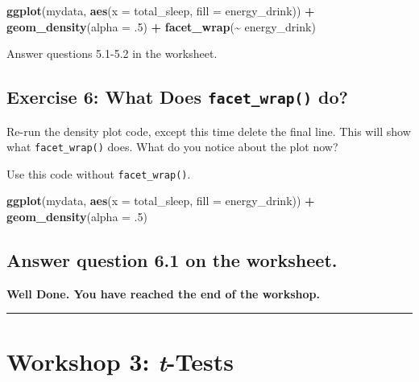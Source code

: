 \documentclass[
]{book}
\newenvironment{Shaded}{\begin{snugshade}}{\end{snugshade}}
\newcommand{\AttributeTok}[1]{\textcolor[rgb]{0.13,0.29,0.53}{#1}}
\newcommand{\DecValTok}[1]{\textcolor[rgb]{0.00,0.00,0.81}{#1}}
\newcommand{\FunctionTok}[1]{\textcolor[rgb]{0.13,0.29,0.53}{\textbf{#1}}}
\newcommand{\NormalTok}[1]{#1}
\newcommand{\SpecialCharTok}[1]{\textcolor[rgb]{0.81,0.36,0.00}{\textbf{#1}}}
\let\oldsection\section
\renewcommand{\section}{\needspace{5\baselineskip}\oldsection}
\begin{document}
\begin{Shaded}
\begin{Highlighting}[]
\FunctionTok{ggplot}\NormalTok{(mydata, }\FunctionTok{aes}\NormalTok{(}\AttributeTok{x =}\NormalTok{ total\_sleep, }\AttributeTok{fill =}\NormalTok{ energy\_drink)) }\SpecialCharTok{+}
  \FunctionTok{geom\_density}\NormalTok{(}\AttributeTok{alpha =}\NormalTok{ .}\DecValTok{5}\NormalTok{) }\SpecialCharTok{+}
  \FunctionTok{facet\_wrap}\NormalTok{(}\SpecialCharTok{\textasciitilde{}}\NormalTok{ energy\_drink)}
\end{Highlighting}
\end{Shaded}

Answer questions 5.1-5.2 in the worksheet.

\section{\texorpdfstring{Exercise 6: What Does \texttt{facet\_wrap()} do?}{Exercise 6: What Does facet\_wrap() do?}}\label{exercise-6-what-does-facet_wrap-do}

Re-run the density plot code, except this time delete the final line. This will show what \texttt{facet\_wrap()} does. What do you notice about the plot now?

Use this code without \texttt{facet\_wrap()}.

\begin{Shaded}
\begin{Highlighting}[]
\FunctionTok{ggplot}\NormalTok{(mydata, }\FunctionTok{aes}\NormalTok{(}\AttributeTok{x =}\NormalTok{ total\_sleep, }\AttributeTok{fill =}\NormalTok{ energy\_drink)) }\SpecialCharTok{+}
  \FunctionTok{geom\_density}\NormalTok{(}\AttributeTok{alpha =}\NormalTok{ .}\DecValTok{5}\NormalTok{)}
\end{Highlighting}
\end{Shaded}

\section{Answer question 6.1 on the worksheet.}\label{answer-question-6.1-on-the-worksheet.}

\textbf{Well Done. You have reached the end of the workshop.}

\begin{center}\rule{0.5\linewidth}{0.5pt}\end{center}

\chapter{\texorpdfstring{Workshop 3: \emph{t}-Tests}{Workshop 3: t-Tests}}\label{workshop-3-t-tests}
\end{document}
